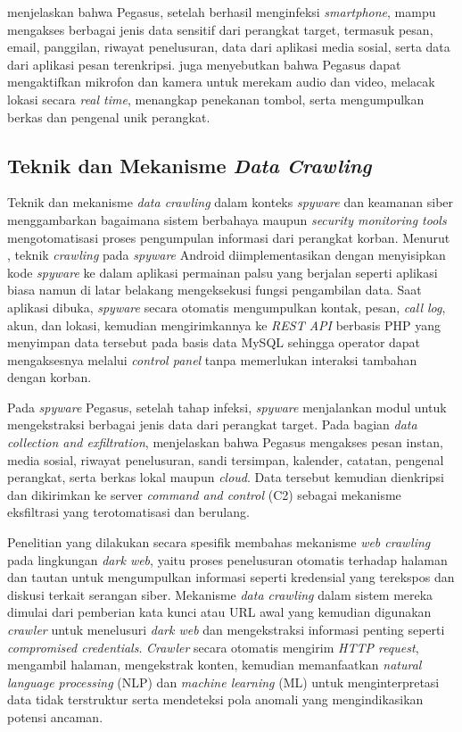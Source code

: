 \textcite{kareem2024pegasus} menjelaskan bahwa Pegasus, setelah berhasil menginfeksi 
\textit{smartphone}, mampu mengakses berbagai jenis data sensitif dari 
perangkat target, termasuk pesan, email, panggilan, riwayat penelusuran, 
data dari aplikasi media sosial, serta data dari aplikasi pesan terenkripsi. 
\textcite{kareem2024pegasus} juga menyebutkan bahwa Pegasus dapat mengaktifkan mikrofon 
dan kamera untuk merekam audio dan video, melacak lokasi secara 
\textit{real time}, menangkap penekanan tombol, serta mengumpulkan berkas 
dan pengenal unik perangkat.

\subsection{Teknik dan Mekanisme \textit{Data Crawling}}

Teknik dan mekanisme \textit{data crawling} dalam konteks \textit{spyware} 
dan keamanan siber menggambarkan bagaimana sistem berbahaya maupun 
\textit{security monitoring tools} mengotomatisasi proses pengumpulan 
informasi dari perangkat korban. Menurut \textcite{salih2020spyware}, teknik 
\textit{crawling} pada \textit{spyware} Android diimplementasikan dengan 
menyisipkan kode \textit{spyware} ke dalam aplikasi permainan palsu yang 
berjalan seperti aplikasi biasa namun di latar belakang mengeksekusi fungsi 
pengambilan data. Saat aplikasi dibuka, \textit{spyware} secara otomatis 
mengumpulkan kontak, pesan, \textit{call log}, akun, dan lokasi, kemudian 
mengirimkannya ke \textit{REST API} berbasis PHP yang menyimpan data 
tersebut pada basis data MySQL sehingga operator dapat mengaksesnya melalui 
\textit{control panel} tanpa memerlukan interaksi tambahan dengan korban.

Pada \textit{spyware} Pegasus, setelah tahap infeksi, \textit{spyware} 
menjalankan modul untuk mengekstraksi berbagai jenis data dari perangkat 
target. Pada bagian \textit{data collection and exfiltration}, 
\textcite{kareem2024pegasus} menjelaskan bahwa Pegasus mengakses pesan instan, media 
sosial, riwayat penelusuran, sandi tersimpan, kalender, catatan, pengenal 
perangkat, serta berkas lokal maupun \textit{cloud}. Data tersebut kemudian 
dienkripsi dan dikirimkan ke server \textit{command and control} (C2) 
sebagai mekanisme eksfiltrasi yang terotomatisasi dan berulang.

Penelitian yang dilakukan \textcite{jegan2024aicrawler} secara spesifik membahas 
mekanisme \textit{web crawling} pada lingkungan \textit{dark web}, yaitu 
proses penelusuran otomatis terhadap halaman dan tautan untuk mengumpulkan 
informasi seperti kredensial yang terekspos dan diskusi terkait serangan 
siber. Mekanisme \textit{data crawling} dalam sistem mereka dimulai dari 
pemberian kata kunci atau URL awal yang kemudian digunakan \textit{crawler} 
untuk menelusuri \textit{dark web} dan mengekstraksi informasi penting 
seperti \textit{compromised credentials}. \textit{Crawler} secara otomatis 
mengirim \textit{HTTP request}, mengambil halaman, mengekstrak konten, 
kemudian memanfaatkan \textit{natural language processing} (NLP) dan 
\textit{machine learning} (ML) untuk menginterpretasi data tidak 
terstruktur serta mendeteksi pola anomali yang mengindikasikan potensi 
ancaman.

